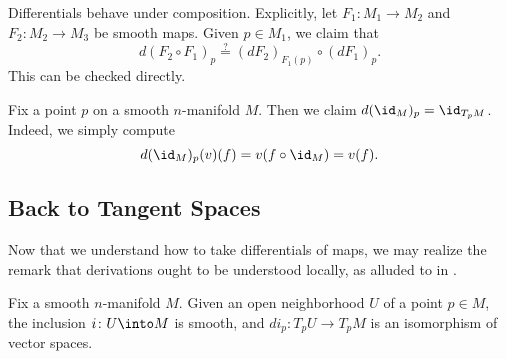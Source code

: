 \documentclass[../notes.tex]{subfiles}
\begin{document}
\begin{remark} \label{rem:diff-comp}
	Differentials behave under composition. Explicitly, let $F_1\colon M_1\to M_2$ and $F_2\colon M_2\to M_3$ be smooth maps. Given $p\in M_1$, we claim that
	\[d(F_2\circ F_1)_p\stackrel?=(dF_2)_{F_1(p)}\circ (dF_1)_p.\]
	This can be checked directly.
\end{remark}
\begin{example} \label{ex:diff-id}
	Fix a point $p$ on a smooth $n$-manifold $M$. Then we claim ${d({\id_M})_p}=\id_{T_pM}$. Indeed, we simply compute
	\[d({\id_M})_p(v)(f)=v(f\circ{\id_M})=v(f).\]
\end{example}

\subsection{Back to Tangent Spaces}
Now that we understand how to take differentials of maps, we may realize the remark that derivations ought to be understood locally, as alluded to in .
\begin{proposition} \label{prop:open-embed-tangent}
	Fix a smooth $n$-manifold $M$. Given an open neighborhood $U$ of a point $p\in M$, the inclusion $i\colon U\into M$ is smooth, and $di_p\colon T_pU\to T_pM$ is an isomorphism of vector spaces.
\end{proposition}
\end{document}
